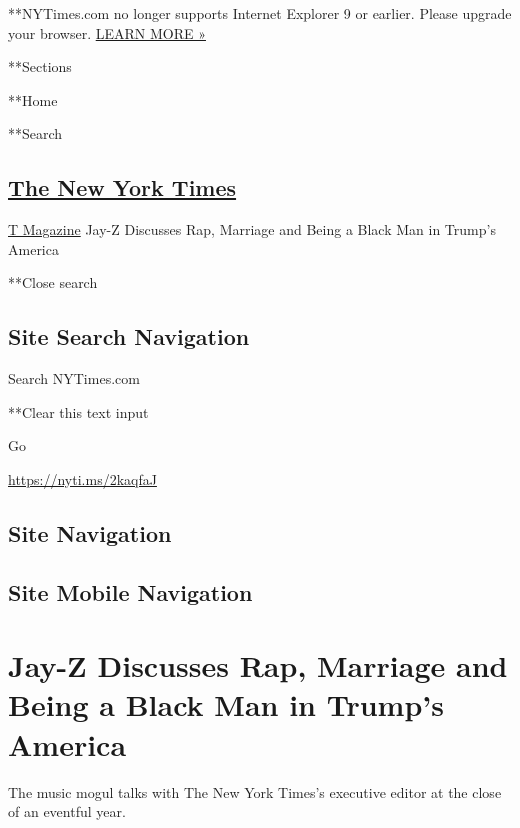  **NYTimes.com no longer supports Internet Explorer 9 or earlier. Please
upgrade your browser.
\href{http://www.nytimes3xbfgragh.onion/content/help/site/ie9-support.html}{LEARN
MORE »}

**Sections

**Home

**Search

\hypertarget{the-new-york-times}{%
\subsection{\texorpdfstring{\href{http://www.nytimes3xbfgragh.onion/}{The
New York Times}}{The New York Times}}\label{the-new-york-times}}

 \href{https://www.nytimes3xbfgragh.onion/section/t-magazine}{T
Magazine} \textbar{}Jay-Z Discusses Rap, Marriage and Being a Black Man
in Trump's America

**Close search

\hypertarget{site-search-navigation}{%
\subsection{Site Search Navigation}\label{site-search-navigation}}

Search NYTimes.com

**Clear this text input

Go

\url{https://nyti.ms/2kaqfaJ}

\hypertarget{site-navigation}{%
\subsection{Site Navigation}\label{site-navigation}}

\hypertarget{site-mobile-navigation}{%
\subsection{Site Mobile Navigation}\label{site-mobile-navigation}}

\hypertarget{jay-z-discusses-rap-marriage-and-being-a-black-man-in-trumps-america}{%
\section{Jay-Z Discusses Rap, Marriage and Being a Black Man in Trump's
America}\label{jay-z-discusses-rap-marriage-and-being-a-black-man-in-trumps-america}}

The music mogul talks with The New York Times's executive editor at the
close of an eventful year.

